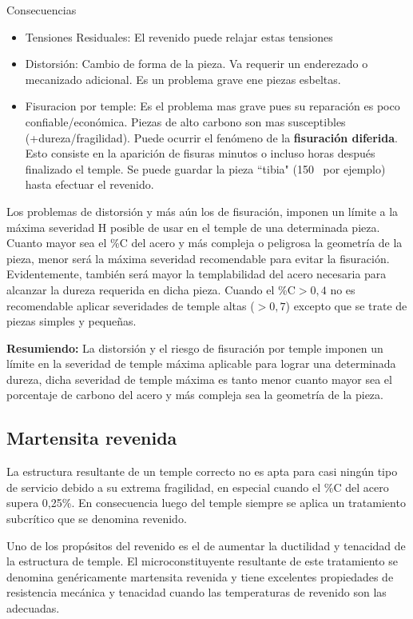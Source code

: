 Consecuencias
\begin{itemize}
    \item Tensiones Residuales: El revenido puede relajar estas tensiones
    \item Distorsión: Cambio de forma de la pieza. Va requerir un enderezado o mecanizado adicional. Es un problema grave ene piezas esbeltas.
    \item Fisuracion por temple: Es el problema mas grave pues su reparación es poco confiable/económica. Piezas de alto carbono son mas susceptibles (+dureza/fragilidad). Puede ocurrir el fenómeno de la \textbf{fisuración diferida}. Esto consiste en la aparición de fisuras minutos o incluso horas después finalizado el temple. Se puede guardar la pieza ``tibia" (150\grad~ por ejemplo) hasta efectuar el revenido.
\end{itemize}
Los problemas de distorsión y más aún los de fisuración, imponen un límite a la máxima severidad H posible de usar en el temple de una determinada pieza. Cuanto mayor sea el \%C del acero y más compleja o peligrosa la geometría de la pieza, menor será la máxima severidad recomendable para evitar la fisuración. Evidentemente, también será mayor la templabilidad del acero necesaria para alcanzar la dureza requerida en dicha pieza.
Cuando el \%C$>0,4$ no es recomendable aplicar severidades de temple altas ($>0,7$) excepto que se trate de piezas simples y pequeñas.

\textbf{Resumiendo:} La distorsión y el riesgo de fisuración por temple imponen un límite en la severidad de temple máxima aplicable para lograr una determinada dureza, dicha severidad de temple máxima es tanto menor cuanto mayor sea el porcentaje de carbono del acero y más compleja sea la geometría de
la pieza.

\subsection{Martensita revenida}
La estructura resultante de un temple correcto no es apta para casi ningún tipo de servicio debido a su extrema fragilidad, en especial cuando el \%C del acero supera 0,25\%. En consecuencia luego del temple siempre se aplica un tratamiento subcrítico que se denomina revenido.

Uno de los propósitos del revenido es el de aumentar la ductilidad y tenacidad de la estructura de temple. El microconstituyente resultante de este tratamiento se denomina genéricamente martensita revenida y tiene excelentes propiedades de resistencia mecánica y tenacidad cuando las temperaturas de revenido son las adecuadas.

